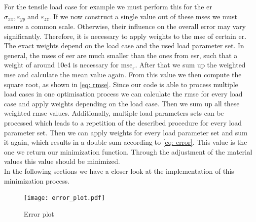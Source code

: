 For the tensile load case for example we must perform this for the \acrlong{er} $\sigma_{xx}, \varepsilon_{yy} \text{ and } \varepsilon_{zz}$. 
If we now construct a single value out of these \acrshort{mse}s we must ensure a common scale. Otherwise, their influence on the overall error may vary significantly. Therefore, it is necessary to apply weights to the \acrshort{mse} of certain \acrlong{er}. The exact weights depend on the load case and the used load parameter set. In general, the \acrshort{mse}s of \acrfull{eer} are much smaller than the ones from \acrfull{esr}, such that a weight of around 10e4 is necessary for $\text{mse}_{\varepsilon}$. After that we sum up the weighted \acrshort{mse} and calculate the mean value again. From this value we then compute the square root, as shown in \autoref{eq: rmse}. Since our code is able to process multiple load cases in one optimisation process we can calculate the \acrshort{rmse} for every load case and apply weights depending on the load case. Then we sum up all these weighted \acrshort{rmse} values. Additionally, multiple load parameters sets can be processed which leads to a repetition of the described procedure for every load parameter set. Then we can apply weights for every load parameter set and sum it again, which results in a double sum according to \autoref{eq: error}. This value is the one we return our minimization function. Through the adjustment of the material values this value should be minimized. \\
In the following sections we have a closer look at the implementation of this minimization process. 

\begin{figure}[H]
    \centering
    \texttt{[image: error\_plot.pdf]}
    \caption{Error plot}
    \label{fig: erroPlot}
\end{figure}


